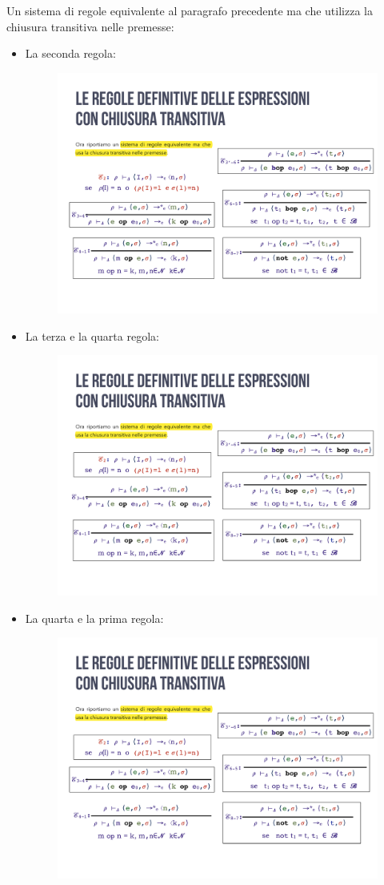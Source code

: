 \documentclass[a4paper]{article}
\begin{document}
 	Un sistema di regole equivalente al paragrafo precedente ma che utilizza la chiusura transitiva nelle premesse:
 	\begin{itemize} 		
 		\item La seconda regola:
 		\begin{figure}[!htp]
 			\centering
 			\includegraphics[width=.7\textwidth]{img/regola_espressione-up-transitiva-2.pdf}
 		\end{figure}
 		
 		\item La terza e la quarta regola:
 		\begin{figure}[!htp]
 			\centering
 			\includegraphics[width=.7\textwidth]{img/regola_espressione-up-transitiva-3_4.pdf}
 		\end{figure}
 		
 		\item La quarta e la prima regola:
 		\begin{figure}[!htp]
 			\centering
 			\includegraphics[width=.7\textwidth]{img/regola_espressione-up-transitiva-4_1.pdf}
 		\end{figure}
 		

\end{itemize}
\end{document}
